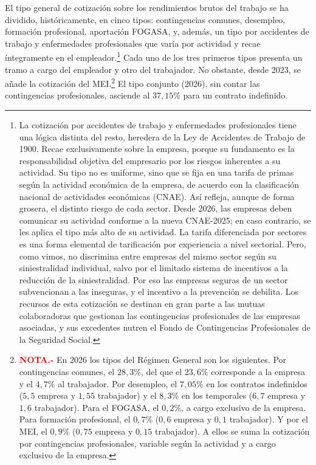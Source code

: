 \documentclass[10pt,a4paper]{article}
\begin{document}
El tipo general de cotización sobre los rendimientos brutos del trabajo se ha dividido, históricamente, en cinco tipos: contingencias comunes, desempleo, formación profesional, aportación FOGASA, y, además, un tipo por accidentes de trabajo y enfermedades profesionales que varía por actividad y recae íntegramente en el empleador.\footnote{La cotización por accidentes de trabajo y enfermedades profesionales tiene una lógica distinta del resto, heredera de la Ley de Accidentes de Trabajo de 1900. Recae exclusivamente sobre la empresa, porque su fundamento es la responsabilidad objetiva del empresario por los riesgos inherentes a su actividad. Su tipo no es uniforme, sino que se fija en una tarifa de primas según la actividad económica de la empresa, de acuerdo con la clasificación nacional de actividades económicas (CNAE). Así refleja, aunque de forma grosera, el distinto riesgo de cada sector. Desde 2026, las empresas deben comunicar su actividad conforme a la nueva CNAE-2025; en caso contrario, se les aplica el tipo más alto de su actividad. La tarifa diferenciada por sectores es una forma elemental de tarificación por experiencia a nivel sectorial. Pero, como vimos, no discrimina entre empresas del mismo sector según su siniestralidad individual, salvo por el limitado sistema de incentivos a la reducción de la siniestralidad. Por eso las empresas seguras de un sector subvencionan a las inseguras, y el incentivo a la prevención se debilita. Los recursos de esta cotización se destinan en gran parte a las mutuas colaboradoras que gestionan las contingencias profesionales de las empresas asociadas, y sus excedentes nutren el Fondo de Contingencias Profesionales de la Seguridad Social.
} Cada uno de los tres primeros tipos presenta un tramo a cargo del empleador y otro del trabajador. No obstante, desde 2023, se añade la cotización del MEI.\footnote{\textcolor{red}{\textbf{NOTA.-}} En 2026 los tipos del Régimen General son los siguientes. Por contingencias comunes, el $28,3\%$, del que el $23,6\%$ corresponde a la empresa y el $4,7\%$ al trabajador. Por desempleo, el $7,05\%$ en los contratos indefinidos ($5,5$ empresa y $1,55$ trabajador) y el $8,3\%$ en los temporales ($6,7$ empresa y $1,6$ trabajador). Para el FOGASA, el $0,2\%$, a cargo exclusivo de la empresa. Para formación profesional, el $0,7\%$ ($0,6$ empresa y $0,1$ trabajador). Y por el MEI, el $0,9\%$ ($0,75$ empresa y $0,15$ trabajador). A ellos se suma la cotización por contingencias profesionales, variable según la actividad y a cargo exclusivo de la empresa. 
} El tipo conjunto (2026), sin contar las contingencias profesionales, asciende al $37,15\%$ para un contrato indefinido.
\end{document}
